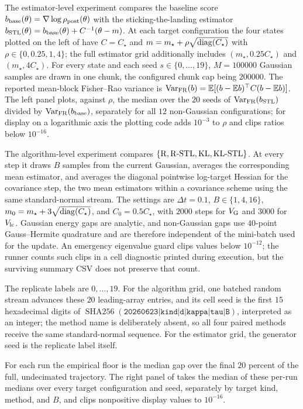 The estimator-level experiment compares the baseline score
$b_{\rm base}(\theta) = \nabla\log\rho_{\mathrm{post}}(\theta)$ with the
sticking-the-landing estimator
$b_{\mathrm{STL}}(\theta) = b_{\rm base}(\theta) + C^{-1}(\theta-m)$.
At each target configuration the four states plotted on the left of
 have $C = C_\star$ and
$m = m_\star + \rho\sqrt{\operatorname{diag}(C_\star)}$ with $\rho\in\{0,0.25,1,4\}$; the full
estimator grid additionally includes $(m_\star,0.25C_\star)$ and
$(m_\star,4C_\star)$. For every state and each seed $s\in\{0,\ldots,19\}$,
$M = 100000$ Gaussian samples are drawn in one chunk, the configured chunk cap
being $200000$. The reported mean-block Fisher--Rao variance is
$\operatorname{Var}_{\mathrm{FR}}(b) = \mathbb{E}[(b-\mathbb{E} b)^\top C(b-\mathbb{E} b)]$. The left panel plots, against
$\rho$, the median over the $20$ seeds of $\operatorname{Var}_{\mathrm{FR}}(b_{\mathrm{STL}})$ divided by
$\operatorname{Var}_{\mathrm{FR}}(b_{\rm base})$, separately for
all $12$ non-Gaussian configurations; for display on a logarithmic axis the
plotting code adds $10^{-3}$ to $\rho$ and clips ratios below $10^{-16}$.

The algorithm-level experiment compares
$\{\mathrm{R},\mathrm{R}\text{-}\mathrm{STL},\mathrm{KL},\mathrm{KL}\text{-}\mathrm{STL}\}$. At every step it draws $B$
samples from the current Gaussian, averages the corresponding mean estimator,
and averages the diagonal pointwise log-target Hessian for the covariance step,
the two mean estimators within a covariance scheme using the same
standard-normal stream. The settings are $\Delta t = 0.1$, $B\in\{1,4,16\}$,
$m_0 = m_\star + 3\sqrt{\operatorname{diag}(C_\star)}$, and $C_0 = 0.5C_\star$,
with $2000$ steps for $V_{\rm G}$ and $3000$ for $V_{\rm lc}$. Gaussian energy
gaps are analytic, and non-Gaussian gaps use $40$-point Gauss--Hermite
quadrature and are therefore independent of the mini-batch used for the update.
An emergency eigenvalue guard clips values below $10^{-12}$; the runner counts
such clips in a cell diagnostic printed during execution, but the surviving
summary CSV does not preserve that count.

The replicate labels are $0,\ldots,19$. For the algorithm grid, one batched
random stream advances these $20$ leading-array entries, and its cell seed is
the first $15$ hexadecimal digits of
$\operatorname{SHA256}(\texttt{20260623|kind|d|kappa|tau|B})$, interpreted as an
integer; the method name is deliberately absent, so all four paired methods
receive the same standard-normal sequence. For the estimator grid, the generator
seed is the replicate label itself.

For each run the empirical floor is the median gap over the final $20$ percent
of the full, undecimated trajectory. The right panel of  takes
the median of these per-run medians over every target configuration and seed,
separately by target kind, method, and $B$, and clips nonpositive display values
to $10^{-16}$.

